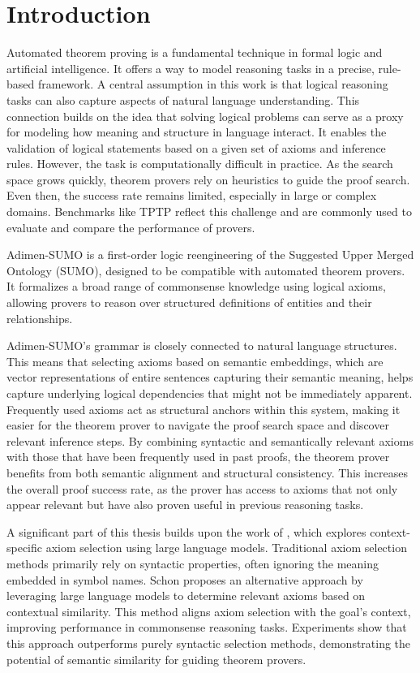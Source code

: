 \documentclass[english,version-2020-11]{uzl-thesis}
\begin{document}
%
%

\chapter{Introduction}
\label{chapter-introduction}

Automated theorem proving is a fundamental technique in formal logic and artificial intelligence. It offers a way to model reasoning tasks in a precise, rule-based framework. A central assumption in this work is that logical reasoning tasks can also capture aspects of natural language understanding. This connection builds on the idea that solving logical problems can serve as a proxy for modeling how meaning and structure in language interact. It enables the validation of logical statements based on a given set of axioms and inference rules. However, the task is computationally difficult in practice. As the search space grows quickly, theorem provers rely on heuristics to guide the proof search. Even then, the success rate remains limited, especially in large or complex domains. Benchmarks like TPTP reflect this challenge and are commonly used to evaluate and compare the performance of provers.

Adimen-SUMO is a first-order logic reengineering of the Suggested Upper Merged Ontology (SUMO), designed to be compatible with automated theorem provers. It formalizes a broad range of commonsense knowledge using logical axioms, allowing provers to reason over structured definitions of entities and their relationships.

Adimen-SUMO’s grammar is closely connected to natural language structures. This means that selecting axioms based on semantic embeddings, which are vector representations of entire sentences capturing their semantic meaning, helps capture underlying logical dependencies that might not be immediately apparent. Frequently used axioms act as structural anchors within this system, making it easier for the theorem prover to navigate the proof search space and discover relevant inference steps. By combining syntactic and semantically relevant axioms with those that have been frequently used in past proofs, the theorem prover benefits from both semantic alignment and structural consistency. This increases the overall proof success rate, as the prover has access to axioms that not only appear relevant but have also proven useful in previous reasoning tasks.

A significant part of this thesis builds upon the work of \cite{Schon2024}, which explores context-specific axiom selection using large language models. Traditional axiom selection methods primarily rely on syntactic properties, often ignoring the meaning embedded in symbol names. Schon proposes an alternative approach by leveraging large language models to determine relevant axioms based on contextual similarity. This method aligns axiom selection with the goal's context, improving performance in commonsense reasoning tasks. Experiments show that this approach outperforms purely syntactic selection methods, demonstrating the potential of semantic similarity for guiding theorem provers.
\end{document}
